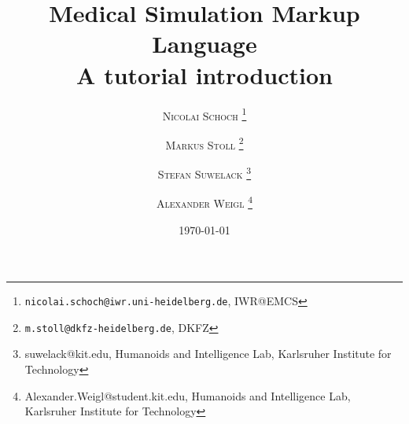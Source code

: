 \documentclass[twocolumn,twoside]{article}
\begin{document}

\title{
  \vspace{-15mm}
  { \fontsize{24pt}{10pt}\selectfont
    \textbf{Medical Simulation Markup Language}
  }
  \\[0.5em]
  A tutorial introduction
} %

\author{
  \large
  \textsc{Nicolai Schoch}
  \thanks{%
    \texttt{nicolai.schoch@iwr.uni-heidelberg.de}, IWR@EMCS
  }
  \and
  \textsc{Markus Stoll}
  \thanks{%
    \texttt{m.stoll@dkfz-heidelberg.de},
    DKFZ
  }
  \and
  \textsc{Stefan Suwelack}
  \thanks{%
    suwelack@kit.edu,
    Humanoids and Intelligence Lab, Karlsruher Institute for Technology
  }
  \and
  \textsc{Alexander Weigl}
  \thanks{%
    Alexander.Weigl@student.kit.edu,
    Humanoids and Intelligence Lab, Karlsruher Institute for Technology
  }
  \\[2mm]
}

\date{\today}
\thispagestyle{fancy} %










\end{document}
